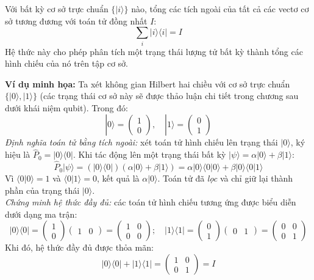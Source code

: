 \begin{proposition} Với bất kỳ cơ sở trực chuẩn $\{|i\rangle\}$ nào, tổng các tích ngoài của tất cả các vectơ cơ sở tương đương với toán tử đồng nhất $I$:$$\sum_i |i\rangle\langle i| = I$$Hệ thức này cho phép phân tích một trạng thái lượng tử bất kỳ thành tổng các hình chiếu của nó trên tập cơ sở.
\end{proposition}

\begin{framed}
\textbf{Ví dụ minh họa:} Ta xét không gian Hilbert hai chiều với cơ sở trực chuẩn $\{|0\rangle, |1\rangle\}$ (các trạng thái cơ sở này sẽ được thảo luận chi tiết trong chương sau dưới khái niệm qubit). Trong đó:$$|0\rangle = \begin{pmatrix} 1 \\ 0 \end{pmatrix}, \quad |1\rangle = \begin{pmatrix} 0 \\ 1 \end{pmatrix}$$
\textit{Định nghĩa toán tử bằng tích ngoài:} xét toán tử hình chiếu lên trạng thái $|0\rangle$, ký hiệu là $\hat{P}_0 = |0\rangle\langle 0|$. Khi tác động lên một trạng thái bất kỳ $|\psi\rangle = \alpha|0\rangle + \beta|1\rangle$:
$$\hat{P}_0 |\psi\rangle = (|0\rangle\langle 0|) (\alpha|0\rangle + \beta|1\rangle) = \alpha|0\rangle\langle 0|0\rangle + \beta|0\rangle\langle 0|1\rangle$$Vì $\langle 0|0\rangle = 1$ và $\langle 0|1\rangle = 0$, kết quả là $\alpha|0\rangle$. Toán tử đã \textit{lọc} và chỉ giữ lại thành phần của trạng thái $|0\rangle$.\\
\textit{Chứng minh hệ thức đầy đủ:} các toán tử hình chiếu tương ứng được biểu diễn dưới dạng ma trận:
$$|0\rangle\langle 0| = \begin{pmatrix} 1 \\ 0 \end{pmatrix} \begin{pmatrix} 1 & 0 \end{pmatrix} = \begin{pmatrix} 1 & 0 \\ 0 & 0 \end{pmatrix}; \quad |1\rangle\langle 1| = \begin{pmatrix} 0 \\ 1 \end{pmatrix} \begin{pmatrix} 0 & 1 \end{pmatrix} = \begin{pmatrix} 0 & 0 \\ 0 & 1 \end{pmatrix}$$
Khi đó, hệ thức đầy đủ được thỏa mãn:$$|0\rangle\langle 0| + |1\rangle\langle 1| = \begin{pmatrix} 1 & 0 \\ 0 & 1 \end{pmatrix} = I$$
\end{framed}

